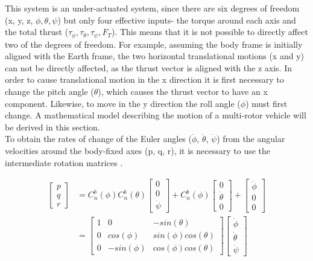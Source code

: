 This system is an under-actuated system, since there are six degrees of freedom (x, y, z, $\phi, \theta, \psi$) but only four effective inputs- the torque around each axis and the total thrust (\(\tau_{\phi},\tau_{\theta}, \tau_{\psi}, F_{T}\)). This means that it is not possible to directly affect two of the degrees of freedom. For example, assuming the body frame is initially aligned with the Earth frame, the two horizontal translational motions (x and y) can not be directly affected, as the thrust vector is aligned with the z axis. In order to cause translational motion in the x direction it is first necessary to change the pitch angle ($\theta$), which causes the thrust vector to have an x component. Likewise, to move in the y direction the roll angle ($\phi$) must first change. A mathematical model describing the motion of a multi-rotor vehicle will be derived in this section.\\

To obtain the rates of change of the Euler angles ($\dot{\phi}$, $\dot{\theta}$, $\dot{\psi}$) from the angular velocities around the body-fixed axes (p, q, r), it is necessary to use the intermediate rotation matrices \cite{Nelson1997}.


\begin{align*}
\begin{bmatrix}
p\\q\\r
\end{bmatrix}
&= C^{b}_{n}(\phi)C^{b}_{n}(\theta)
\begin{bmatrix}
0\\0\\\dot{\psi}
\end{bmatrix}
+C^{b}_{n}(\phi)
\begin{bmatrix}
0\\\dot{\theta}\\0
\end{bmatrix}
+
\begin{bmatrix}
\dot{\phi}\\0\\0
\end{bmatrix}\\
&=
\begin{bmatrix}
1 & 0 & -sin(\theta)\\
0 & cos(\phi) & sin(\phi)cos(\theta)\\
0 & -sin(\phi) & cos(\phi)cos(\theta)
\end{bmatrix}
\begin{bmatrix}
\dot{\phi}\\ \dot{\theta} \\ \dot{\psi}
\end{bmatrix}\\
\end{align*}

